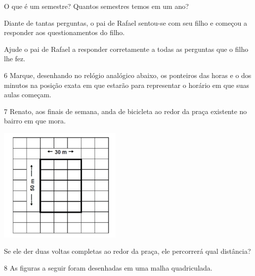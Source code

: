 O que é um semestre? 
Quantos semestres temos em um ano?

Diante de tantas perguntas, o pai de Rafael sentou-se com seu filho e
começou a responder aos questionamentos do filho.

Ajude o pai de Rafael a responder corretamente a todas as perguntas que o filho lhe fez.


\num{6} Marque, desenhando no relógio analógico abaixo, os ponteiros das horas e o dos
minutos na posição exata em que estarão para representar o horário em que
suas aulas começam.




\num{7} Renato, aos finais de semana, anda de bicicleta ao redor da praça existente no bairro em que mora.


\includegraphics[width=2.35256in,height=2.20730in]{./media/image55.png}

Se ele der duas voltas completas ao redor da praça, ele percorrerá qual distância?



\num{8} As figuras a seguir foram desenhadas em uma malha quadriculada.


